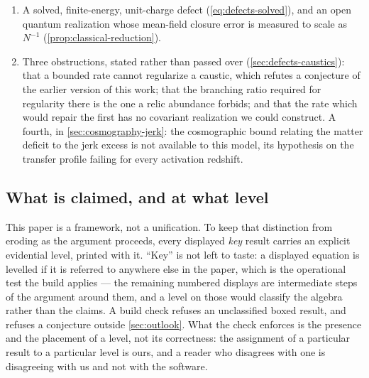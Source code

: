 \begin{enumerate}
    identifies.
  \item A solved, finite-energy, unit-charge defect
    (\cref{eq:defects-solved}), and an open quantum realization whose
    mean-field closure error is measured to scale as $N^{-1}$
    (\cref{prop:classical-reduction}).
  \item Three obstructions, stated rather than passed over
    (\cref{sec:defects-caustics}): that a bounded rate cannot regularize a
    caustic, which refutes a conjecture of the earlier version of this work;
    that the branching ratio required for regularity there is the one a relic
    abundance forbids; and that the rate which would repair the first has no
    covariant realization we could construct. A fourth, in
    \cref{sec:cosmography-jerk}: the cosmographic bound relating the matter
    deficit to the jerk excess is not available to this model, its hypothesis
    on the transfer profile failing for every activation redshift.
\end{enumerate}

\subsection{What is claimed, and at what level}\label{sec:intro-ladder}

This paper is a framework, not a unification. To keep that distinction from
eroding as the argument proceeds, every displayed \emph{key} result carries an
explicit evidential level, printed with it. ``Key'' is not left to taste: a
displayed equation is levelled if it is referred to anywhere else in the
paper, which is the operational test the build applies --- the remaining
numbered displays are intermediate steps of the argument around them, and a
level on those would classify the algebra rather than the claims. A build check
refuses an unclassified boxed result, and refuses a conjecture outside
\cref{sec:outlook}. What the check enforces is the presence and the placement
of a level, not its correctness: the assignment of a particular result to a
particular level is ours, and a reader who disagrees with one is disagreeing
with us and not with the software.

